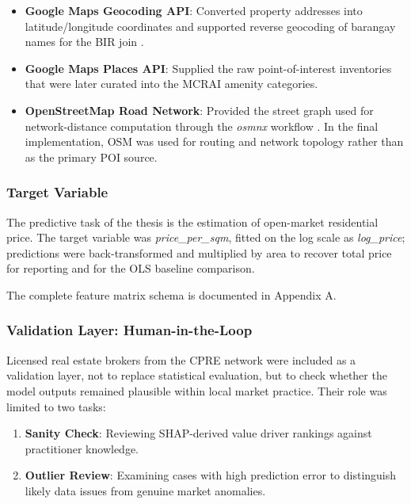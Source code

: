 \begin{itemize}
\item \textbf{Google Maps Geocoding API}: Converted property addresses into latitude/longitude coordinates and supported reverse geocoding of barangay names for the BIR join \parencite{googlemaps2025}.
\item \textbf{Google Maps Places API}: Supplied the raw point-of-interest inventories that were later curated into the MCRAI amenity categories.
\item \textbf{OpenStreetMap Road Network}: Provided the street graph used for network-distance computation through the \emph{osmnx} workflow \parencite{boeing2017osmnx,boeing2019urban}. In the final implementation, OSM was used for routing and network topology rather than as the primary POI source.
\end{itemize}

\subsubsection{Target Variable}\label{target-variable}

The predictive task of the thesis is the estimation of open-market residential price. The target variable was \emph{price\_per\_sqm}, fitted on the log scale as \emph{log\_price}; predictions were back-transformed and multiplied by area to recover total price for reporting and for the OLS baseline comparison.

The complete feature matrix schema is documented in Appendix A.

\subsubsection{Validation Layer: Human-in-the-Loop}\label{validation-layer-human-in-the-loop}

Licensed real estate brokers from the CPRE network were included as a validation layer, not to replace statistical evaluation, but to check whether the model outputs remained plausible within local market practice. Their role was limited to two tasks:

\begin{enumerate}
\item \textbf{Sanity Check}: Reviewing SHAP-derived value driver rankings against practitioner knowledge.
\item \textbf{Outlier Review}: Examining cases with high prediction error to distinguish likely data issues from genuine market anomalies.
\end{enumerate}


